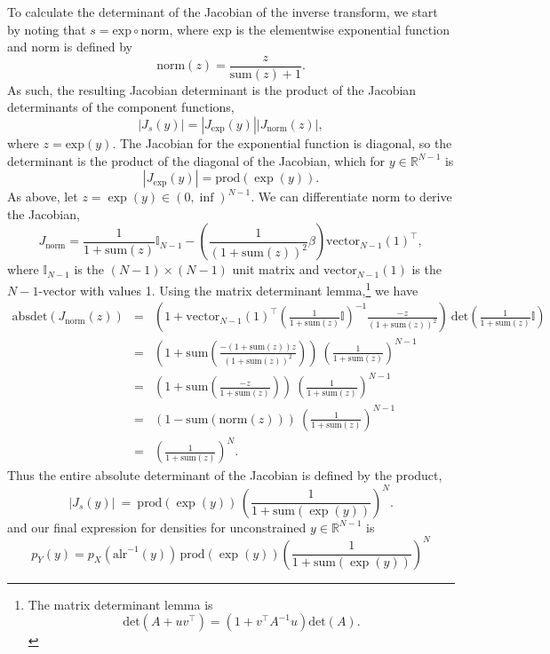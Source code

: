 \documentclass[11pt]{article}
\newcommand{\abs}[1]{\left| #1 \right|}
\newcommand{\absdet}[1]{\abs{#1}}
\begin{document}
To calculate the determinant of the Jacobian of the inverse transform,
we start by noting that $s = \textrm{exp} \circ \textrm{norm}$, where
$\textrm{exp}$ is the elementwise exponential function and
\textrm{norm} is defined by
\[
  \textrm{norm}(z) = \frac{z}{\textrm{sum}(z) + 1}.
\]
As such, the resulting Jacobian determinant is the product of the
Jacobian determinants of the component functions,
\[
  \absdet{J_s(y)}
  = \absdet{J_{\textrm{exp}}(y)} \absdet{J_{\textrm{norm}}(z)},
\]
where $z = \textrm{exp}(y)$.  The Jacobian for the exponential
function is diagonal, so the determinant is the product of the
diagonal of the Jacobian, which for $y \in \mathbb{R}^{N-1}$ is
\[
  \absdet{J_{\textrm{exp}}(y)} = \textrm{prod}(\exp(y)).
\]
As above, let $z = \exp(y) \in (0, \inf)^{N-1}$.  We can differentiate
$\textrm{norm}$ to derive the Jacobian,
\[
  J_{\textrm{norm}}
  = \frac{1}{1 + \textrm{sum}(z)} \mathbb{I}_{N-1}
  - \left(\frac{1}{(1 + \textrm{sum}(z))^2} \beta \right)
  \textrm{vector}_{N-1}(1)^{\top},
\]
where $\mathbb{I}_{N-1}$ is the $(N - 1) \times (N - 1)$ unit matrix and
$\textrm{vector}_{N-1}(1)$ is the $N - 1$-vector with values 1.  Using
the matrix determinant lemma,\footnote{The matrix determinant lemma
  is \[\textrm{det}(A + u v^{\top}) = (1 + v^{\top} A^{-1} u)
    \textrm{det}(A).\]}
we have
\begin{eqnarray*}
  \textrm{absdet}(J_{\textrm{norm}}(z))
  & = &
  \left(
    1
    + \textrm{vector}_{N-1}(1)^{\top}
    \left(\frac{1}{1 + \textrm{sum}(z)} \mathbb{I} \right)^{-1}
    \frac{-z}{(1 + \textrm{sum}(z))^2}
    \right)
    \ \textrm{det}\left(\frac{1}{1 + \textrm{sum}(z)} \mathbb{I}
        \right)
  \\[6pt]
  & = &
  \left(
    1 
    + \textrm{sum}\left( \frac{-(1 + \textrm{sum}(z)) z}{(1 +
        \textrm{sum}(z))^2} \right)
  \right)
        \ \left( \frac{1}{1 + \textrm{sum}(z)} \right)^{N-1}
  \\[6pt]
  & = &
        \left(1 + \textrm{sum}\left(\frac{-z}{1 + \textrm{sum}(z)} \right)\right)        
        \ \left( \frac{1}{1 + \textrm{sum}(z)} \right)^{N-1}
  \\[6pt]
  & = & \left( 1 - \textrm{sum}(\textrm{norm}(z)) \right) 
        \ \left( \frac{1}{1 + \textrm{sum}(z)} \right)^{N-1}
  \\[6pt]
  & = & \left( \frac{1}{1 + \textrm{sum}(z)} \right)^N.
\end{eqnarray*}
Thus the entire absolute determinant of the Jacobian is defined by the
product, 
\[
  \absdet{J_s(y)}
  \ = \
  \textrm{prod}(\exp(y))
  \, \left( \frac{1}{1 + \textrm{sum}(\exp(y))} \right)^N.
\]
and our final expression for densities for unconstrained $y \in
\mathbb{R}^{N-1}$ is
\[
  p_Y(y)
  = p_X(\textrm{alr}^{-1}(y))
  \, \textrm{prod}(\exp(y))
  \left( \frac{1}{1 + \textrm{sum}(\exp(y))} \right)^N
\]  
\end{document}
